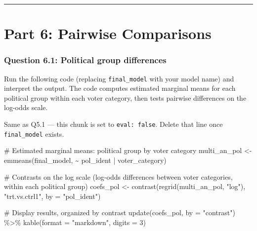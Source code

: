 \documentclass[
  letterpaper,
  DIV=11,
  numbers=noendperiod]{scrartcl}
\newenvironment{Shaded}{\begin{snugshade}}{\end{snugshade}}
\newcommand{\AttributeTok}[1]{\textcolor[rgb]{0.40,0.45,0.13}{#1}}
\newcommand{\CommentTok}[1]{\textcolor[rgb]{0.37,0.37,0.37}{#1}}
\newcommand{\DecValTok}[1]{\textcolor[rgb]{0.68,0.00,0.00}{#1}}
\newcommand{\FunctionTok}[1]{\textcolor[rgb]{0.28,0.35,0.67}{#1}}
\newcommand{\NormalTok}[1]{\textcolor[rgb]{0.00,0.23,0.31}{#1}}
\newcommand{\OtherTok}[1]{\textcolor[rgb]{0.00,0.23,0.31}{#1}}
\newcommand{\SpecialCharTok}[1]{\textcolor[rgb]{0.37,0.37,0.37}{#1}}
\newcommand{\StringTok}[1]{\textcolor[rgb]{0.13,0.47,0.30}{#1}}
\begin{document}
\begin{center}\rule{0.5\linewidth}{0.5pt}\end{center}

\section{Part 6: Pairwise
Comparisons}\label{part-6-pairwise-comparisons}

\subsubsection*{Question 6.1: Political group
differences}\label{question-6.1-political-group-differences}

Run the following code (replacing \texttt{final\_model} with your model
name) and interpret the output. The code computes estimated marginal
means for each political group within each voter category, then tests
pairwise differences on the log-odds scale.

\begin{tcolorbox}[enhanced jigsaw, toprule=.15mm, opacitybacktitle=0.6, coltitle=black, opacityback=0, bottomrule=.15mm, left=2mm, colframe=quarto-callout-note-color-frame, leftrule=.75mm, toptitle=1mm, colbacktitle=quarto-callout-note-color!10!white, rightrule=.15mm, colback=white, title=\textcolor{quarto-callout-note-color}{\faInfo}\hspace{0.5em}{Note}, arc=.35mm, bottomtitle=1mm, titlerule=0mm, breakable]

Same as Q5.1 --- this chunk is set to \texttt{eval:\ false}. Delete that
line once \texttt{final\_model} exists.

\end{tcolorbox}

\begin{Shaded}
\begin{Highlighting}[]
\CommentTok{\# Estimated marginal means: political group by voter category}
\NormalTok{multi\_an\_pol }\OtherTok{\textless{}{-}} \FunctionTok{emmeans}\NormalTok{(final\_model, }\SpecialCharTok{\textasciitilde{}}\NormalTok{ pol\_ident }\SpecialCharTok{|}\NormalTok{ voter\_category)}

\CommentTok{\# Contrasts on the log scale (log{-}odds differences between voter categories, within each political group)}
\NormalTok{coefs\_pol }\OtherTok{\textless{}{-}} \FunctionTok{contrast}\NormalTok{(}\FunctionTok{regrid}\NormalTok{(multi\_an\_pol, }\StringTok{"log"}\NormalTok{), }\StringTok{"trt.vs.ctrl1"}\NormalTok{, }\AttributeTok{by =} \StringTok{"pol\_ident"}\NormalTok{)}

\CommentTok{\# Display results, organized by contrast}
\FunctionTok{update}\NormalTok{(coefs\_pol, }\AttributeTok{by =} \StringTok{"contrast"}\NormalTok{) }\SpecialCharTok{\%\textgreater{}\%}
  \FunctionTok{kable}\NormalTok{(}\AttributeTok{format =} \StringTok{"markdown"}\NormalTok{, }\AttributeTok{digits =} \DecValTok{3}\NormalTok{)}
\end{Highlighting}
\end{Shaded}
\end{document}
